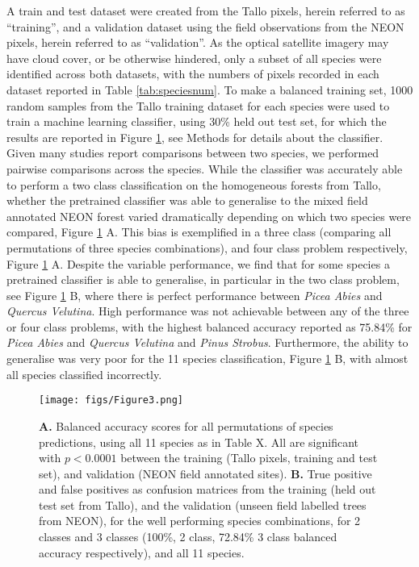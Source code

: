 \documentclass[9pt,lineno]{elife}
\begin{document}
A train and test dataset were created from the Tallo pixels, herein referred to as ``training'', and a validation dataset using the field observations from the NEON pixels, herein referred to as ``validation''. As the optical satellite imagery may have cloud cover, or be otherwise hindered, only a subset of all species were identified across both datasets, with the numbers of pixels recorded in each dataset reported in Table \ref{tab:speciesnum}. To make a balanced training set, 1000 random samples from the Tallo training dataset for each species were used to train a machine learning classifier, using 30\% held out test set, for which the results are reported in Figure \ref{fig:fig3}, see Methods for details about the classifier. Given many studies report comparisons between two species, we performed pairwise comparisons across the species. While the classifier was accurately able to perform a two class classification on the homogeneous forests from Tallo, whether the pretrained classifier was able to generalise to the mixed field annotated NEON forest varied dramatically depending on which two species were compared, Figure \ref{fig:fig3} A. This bias is exemplified in a three class (comparing all permutations of three species combinations), and four class problem respectively, Figure \ref{fig:fig3} A. Despite the variable performance, we find that for some species a pretrained classifier is able to generalise, in particular in the two class problem, see Figure \ref{fig:fig3} B, where there is perfect performance between \textit{Picea Abies} and \textit{Quercus Velutina}. High performance was not achievable between any of the three or four class problems, with the highest balanced accuracy reported as 75.84\% for \textit{Picea Abies} and \textit{Quercus Velutina} and \textit{Pinus Strobus}. Furthermore, the ability to generalise was very poor for the 11 species classification, Figure \ref{fig:fig3} B, with almost all species classified incorrectly.



\begin{figure}
\begin{fullwidth}
\begin{center}
\texttt{[image: figs/Figure3.png]}
\caption{
        \textbf{A.} Balanced accuracy scores for all permutations of species predictions, using all 11 species as in Table X. All are significant with $p<0.0001$ between the training (Tallo pixels, training and test set), and validation (NEON field annotated sites).
        \textbf{B.} True positive and false positives as confusion matrices from the training (held out test set from Tallo), and the validation (unseen field labelled trees from NEON), for the well performing species combinations, for 2 classes and 3 classes (100\%, 2 class, 72.84\% 3 class balanced accuracy respectively), and all 11 species.
}
\label{fig:fig3}
\end{center}
\end{fullwidth}
\end{figure}
\end{document}
